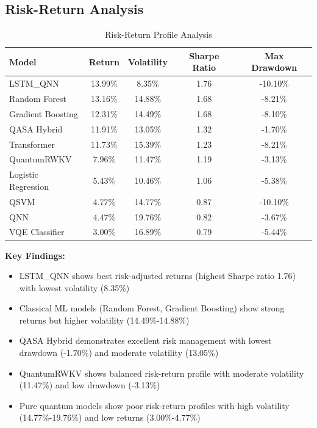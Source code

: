 \documentclass[12pt,a4paper]{article}
\begin{document}
\subsection{Risk-Return Analysis}

\begin{table}[H]
\centering
\begin{tabular}{@{}lcccc@{}}
\toprule
\textbf{Model} & \textbf{Return} & \textbf{Volatility} & \textbf{Sharpe Ratio} & \textbf{Max Drawdown} \\
\midrule
LSTM\_QNN & 13.99\% & 8.35\% & 1.76 & -10.10\% \\
Random Forest & 13.16\% & 14.88\% & 1.68 & -8.21\% \\
Gradient Boosting & 12.31\% & 14.49\% & 1.68 & -8.10\% \\
QASA Hybrid & 11.91\% & 13.05\% & 1.32 & -1.70\% \\
Transformer & 11.73\% & 15.39\% & 1.23 & -8.21\% \\
QuantumRWKV & 7.96\% & 11.47\% & 1.19 & -3.13\% \\
Logistic Regression & 5.43\% & 10.46\% & 1.06 & -5.38\% \\
QSVM & 4.77\% & 14.77\% & 0.87 & -10.10\% \\
QNN & 4.47\% & 19.76\% & 0.82 & -3.67\% \\
VQE Classifier & 3.00\% & 16.89\% & 0.79 & -5.44\% \\
\bottomrule
\end{tabular}
\caption{Risk-Return Profile Analysis}
\end{table}

\textbf{Key Findings:}
\begin{itemize}
    \item LSTM\_QNN shows best risk-adjusted returns (highest Sharpe ratio 1.76) with lowest volatility (8.35\%)
    \item Classical ML models (Random Forest, Gradient Boosting) show strong returns but higher volatility (14.49\%-14.88\%)
    \item QASA Hybrid demonstrates excellent risk management with lowest drawdown (-1.70\%) and moderate volatility (13.05\%)
    \item QuantumRWKV shows balanced risk-return profile with moderate volatility (11.47\%) and low drawdown (-3.13\%)
    \item Pure quantum models show poor risk-return profiles with high volatility (14.77\%-19.76\%) and low returns (3.00\%-4.77\%)
\end{itemize}
\end{document}
